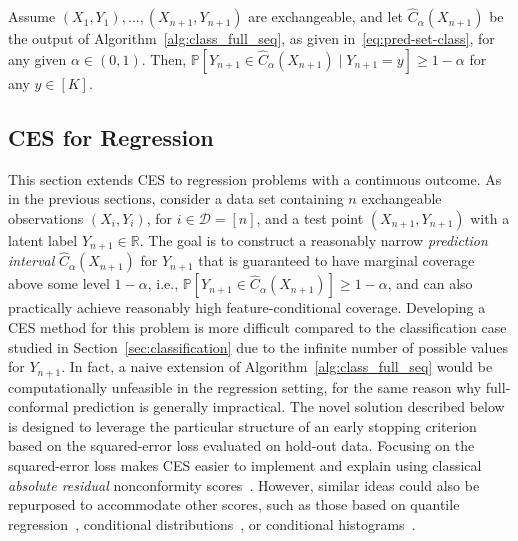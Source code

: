 \begin{theorem}\label{thm:class_full}
Assume $(X_{1},Y_{1}), \ldots, (X_{n+1},Y_{n+1})$ are exchangeable, and let $\hat{C}_{\alpha}(X_{n+1})$ be the output of Algorithm~\ref{alg:class_full_seq}, as given in~\eqref{eq:pred-set-class}, for any given $\alpha \in (0,1)$.
Then, $\mathbb{P}[Y_{n+1} \in \hat{C}_{\alpha}(X_{n+1}) \mid Y_{n+1} = y] \geq 1-\alpha$ for any $y \in [K]$.
\end{theorem}


\subsection{CES for Regression} \label{sec:regression}

This section extends CES to regression problems with a continuous outcome.
As in the previous sections, consider a data set containing $n$ exchangeable observations $(X_i,Y_i)$, for $i \in \mathcal{D} = [n]$, and a test point $(X_{n+1}, Y_{n+1})$ with a latent label $Y_{n+1} \in \mathbb{R}$. The goal is to construct a reasonably narrow {\em prediction interval} $\hat{C}_{\alpha}(X_{n+1})$ for $Y_{n+1}$ that is guaranteed to have marginal coverage above some level $1-\alpha$, i.e., $\mathbb{P}[Y_{n+1} \in \hat{C}_{\alpha}(X_{n+1}) ] \geq 1-\alpha$, and can also practically achieve reasonably high feature-conditional coverage.
Developing a CES method for this problem is more difficult compared to the classification case studied in Section~\ref{sec:classification} due to the infinite number of possible values for $Y_{n+1}$. In fact, a naive extension of Algorithm~\ref{alg:class_full_seq} would be computationally unfeasible in the regression setting, for the same reason why full-conformal prediction \cite{vovk2005algorithmic} is generally impractical.
The novel solution described below is designed to leverage the particular structure of an early stopping criterion based on the squared-error loss evaluated on hold-out data. Focusing on the squared-error loss makes CES easier to implement and explain using classical {\em absolute residual} nonconformity scores~\cite{vovk2005algorithmic,lei2016RegressionPS}.
However, similar ideas could also be repurposed to accommodate other scores, such as those based on quantile regression~\cite{romano2019conformalized}, conditional distributions~\cite{chernozhukov2019distributional,izbicki2019flexible}, or conditional histograms~\cite{sesia2021conformal}.


